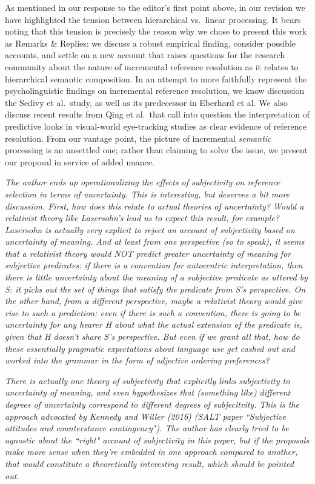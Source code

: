 \documentclass[12pt]{article}
\begin{document}
As mentioned in our response to the editor's first point above, in our revision we have highlighted the tension between hierarchical vs.~linear processing. It bears noting that this tension is precisely the reason why we chose to present this work as Remarks \& Replies: we discuss a robust empirical finding, consider possible accounts, and settle on a new account that raises questions for the research community about the nature of incremental reference resolution as it relates to hierarchical semantic composition. In an attempt to more faithfully represent the psycholinguistic findings on incremental reference resolution, we know discussion the Sedivy et al.~study, as well as its predecessor in Eberhard et al. We also discuss recent results from Qing et al.~that call into question the interpretation of predictive looks in visual-world eye-tracking studies as clear evidence of reference resolution. From our vantage point, the picture of incremental \emph{semantic} processing is an unsettled one; rather than claiming to solve the issue, we present our proposal in service of added nuance. 


\item \emph{The author ends up operationalizing the effects of subjectivity on
reference selection in terms of uncertainty.  This is interesting, but
deserves a bit more discussion.  First, how does this relate to actual
theories of uncertainty?  Would a relativist theory like Lasersohn's lead us
to expect this result, for example? Lasersohn is actually very explicit to
reject an account of subjectivity based on uncertainty of meaning. And at
least from one perspective (so to speak), it seems that a relativist theory
would NOT predict greater uncertainty of meaning for subjective predicates: 
if there is a convention for autocentric interpretation, then there is
little uncertainty about the meaning of a subjective predicate as uttered by
S:  it picks out the set of things that satisfy the predicate from S's
perspective.  On the other hand, from a different perspective, maybe a
relativist theory would give rise to such a prediction:  even if there is
such a convention, there is going to be uncertainty for any hearer H about
what the actual extension of the predicate is, given that H doesn't share
S's perspective.  But even if we grant all that, how do these essentially
pragmatic expectations about language use get cashed out and worked into the
grammar in the form of adjective ordering preferences?}

\emph{There is actually one theory of subjectivity that explicitly links
subjectivity to uncertainty of meaning, and even hypothesizes that
(something like) different degrees of uncertainty correspond to different
degrees of subjecitvity.  This is the approach advocated by Kennedy and
Willer (2016) (SALT paper ``Subjective attitudes and counterstance
contingency").  The author has clearly tried to be agnostic about the
``right" account of subjectivity in this paper, but if the proposals make
more sense when they're embedded in one approach compared to another, that
would constitute a theoretically interesting result, which should be pointed
out.}
\end{document}
